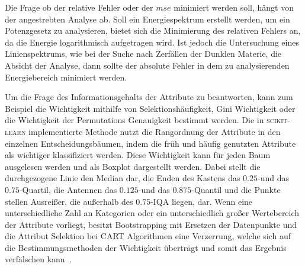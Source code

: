 Die Frage ob der relative Fehler oder der $mse$ minimiert werden soll, hängt von der angestrebten Analyse ab.
Soll ein Energiespektrum erstellt werden, um ein Potenzgesetz zu analysieren, bietet sich die Minimierung des relativen Fehlers an, da die
Energie logarithmisch aufgetragen wird.
Ist jedoch die Untersuchung eines Linienspektrums, wie bei der Suche nach Zerfällen der Dunklen Materie, die Absicht der Analyse, dann sollte
der absolute Fehler in dem zu analysierenden Energiebereich minimiert werden.


Um die Frage des Informationsgehalts der Attribute zu beantworten, kann zum Beispiel die Wichtigkeit mithilfe von Selektionshäufigkeit, Gini Wichtigkeit oder
die Wichtigkeit der Permutations Genauigkeit bestimmt werden.
Die in \textsc{scikit-learn} implementierte Methode nutzt die Rangordnung der Attribute in den einzelnen Entscheidungsbäumen, indem die früh und häufig genutzten Attribute
als wichtiger klassifiziert werden.
Diese Wichtigkeit kann für jeden Baum ausgelesen werden und als Boxplot dargestellt werden.
Dabei stellt die durchgezogene Linie den Median dar, die Enden des Kastens das $\num{0.25}$-und das $\num{0.75}$-Quartil, die Antennen das $\num{0.125}$-und das
$\num{0.875}$-Quantil und die Punkte stellen Ausreißer, die außerhalb des $\num{0.75}$-IQA liegen, dar.
Wenn eine unterschiedliche Zahl an Kategorien oder ein unterschiedlich großer Wertebereich der Attribute vorliegt, besitzt Bootstrapping mit Ersetzen der Datenpunkte
und die Attribut Selektion bei CART Algorithmen eine Verzerrung, welche sich auf die Bestimmungsmethoden der Wichtigkeit überträgt und somit das Ergebnis verfälschen
kann~\cite{feature_importance}.

